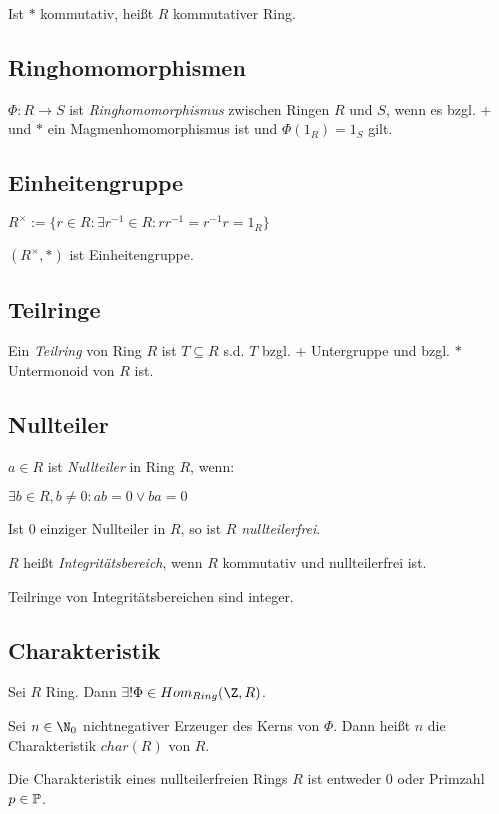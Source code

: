 Ist $*$ kommutativ, heißt $R$ kommutativer Ring.

\subsection*{Ringhomomorphismen}

$\Phi : R \to S$ ist \emph{Ringhomomorphismus} zwischen Ringen $R$ und $S$, wenn es bzgl. $+$ und $*$ ein Magmenhomomorphismus ist und $\Phi(1_R) = 1_S$ gilt.

\subsection*{Einheitengruppe}

$R^\times := \{ r \in R : \exists r^{-1} \in R : r r^{-1} = r^{-1} r = 1_R \}$

$(R^\times, *)$ ist Einheitengruppe.

\subsection*{Teilringe}

Ein \emph{Teilring} von Ring $R$ ist $T \subseteq R$ s.d. $T$ bzgl. $+$ Untergruppe und bzgl. $*$ Untermonoid von $R$ ist.

\subsection*{Nullteiler}

$a \in R$ ist \emph{Nullteiler} in Ring $R$, wenn:

$\exists b \in R, b \neq 0 : ab = 0 \lor ba = 0$

Ist $0$ einziger Nullteiler in $R$, so ist $R$ \emph{nullteilerfrei}.

$R$ heißt \emph{Integritätsbereich}, wenn $R$ kommutativ und nullteilerfrei ist.

Teilringe von Integritätsbereichen sind integer.

\subsection*{Charakteristik}

Sei $R$ Ring. Dann $\exists! \Phi \in Hom_{Ring}(\Z,R)$.

Sei $n \in \N_0$ nichtnegativer Erzeuger des Kerns von $\Phi$. Dann heißt $n$ die Charakteristik $char(R)$ von $R$.

Die Charakteristik eines nullteilerfreien Rings $R$ ist entweder $0$ oder Primzahl $p \in \mathbb{P}$.

